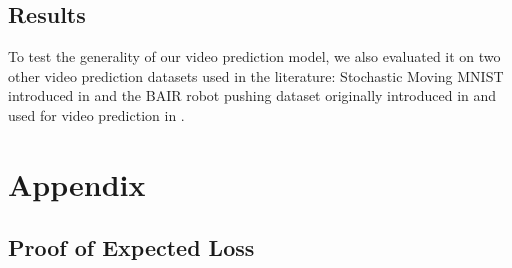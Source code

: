 \documentclass{article}
\begin{document}
\subsection{Results}

To test the generality of our video prediction model, we also evaluated it on two other video prediction datasets used in the literature: Stochastic Moving MNIST introduced in \citep{Denton2018} and the BAIR robot pushing dataset originally introduced in \citep{Ebert17} and used for video prediction in \citep{Babaeizadeh2018, Denton2018}.




%
%
%
%
%
%


\section{Appendix}


\subsection{Proof of Expected Loss}
\end{document}
